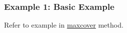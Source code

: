 \subsubsection*{Example 1: Basic Example}

Refer to example in \hyperref[sect:maxcover]{maxcover} method. 

